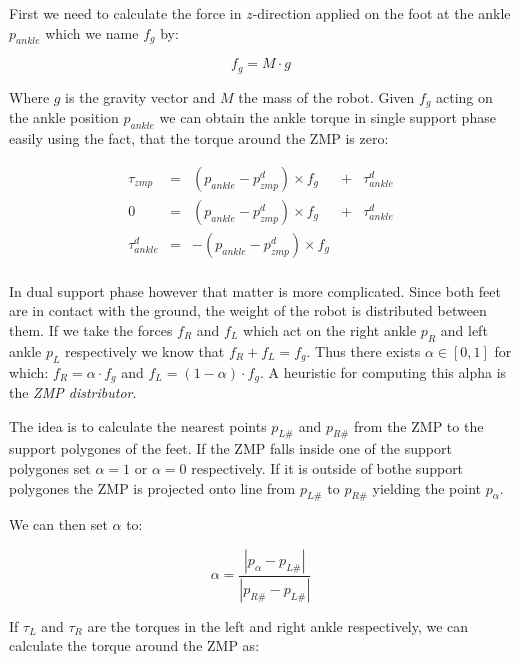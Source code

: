\documentclass[english,ngerman]{KITreprt}
\newcommand{\clr}[2]{{\color{#1}{#2}}}
\newcommand{\todo}[1]{\marginpar{\clr{red}{#1}}}
\begin{document}
First we need to calculate the force in $z$-direction applied on the
foot at the ankle $p_{ankle}$ which we name $f_g$ by:

\begin{equation}
f_g = M \cdot g
\end{equation}

Where $g$ is the gravity vector and $M$ the mass of the robot. Given
$f_g$ acting on the ankle position $p_{ankle}$ we can obtain the ankle
torque in single support phase easily using the fact, that the torque
around the ZMP is zero:

\begin{equation}
\begin{array}{lcccr}
\tau_{zmp} & = & (p_{ankle} - p^d_{zmp}) \times f_g & + & \tau^d_{ankle} \\
0 & = & (p_{ankle} - p^d_{zmp}) \times f_g & + & \tau^d_{ankle} \\
\tau^d_{ankle} & = & -(p_{ankle} - p^d_{zmp}) \times f_g & & \\
\end{array}
\end{equation}

In dual support phase however that matter is more complicated. Since
both feet are in contact with the ground, the weight of the robot is
distributed between them. If we take the forces $f_R$ and $f_L$ which
act on the right ankle $p_R$ and left ankle $p_L$ respectively we know
that $f_R + f_L = f_g$. Thus there exists $\alpha \in [0, 1]$ for which:
$f_R = \alpha \cdot f_g$ and $f_L = (1-\alpha) \cdot f_g$. A heuristic
for computing this alpha is the \emph{ZMP distributor}.

\todo{For some reason I named the class ForceDistributor, I should fix that}

The idea is to calculate the nearest points $p_{L\#}$ and $p_{R\#}$ from
the ZMP to the support polygones of the feet. If the ZMP falls inside
one of the support polygones set $\alpha = 1$ or $\alpha = 0$
respectively. If it is outside of bothe support polygones the ZMP is
projected onto line from $p_{L\#}$ to $p_{R\#}$ yielding the point
$p_{\alpha}$.

We can then set $\alpha$ to:

\begin{equation}
\alpha = \frac{|p_{\alpha} - p_{L\#}|}{|p_{R\#} - p_{L\#}|}
\end{equation}

If $\tau_L$ and $\tau_R$ are the torques in the left and right ankle
respectively, we can calculate the torque around the ZMP as:
\end{document}
